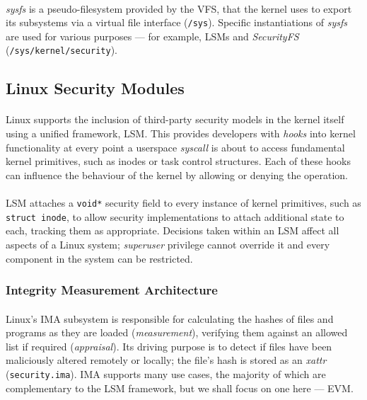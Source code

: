 \paragraph{} \textit{sysfs} is a pseudo-filesystem provided by the VFS, that the kernel uses to export its subsystems via a virtual file interface (\texttt{/sys}). Specific instantiations of \textit{sysfs} are used for various purposes --- for example, LSMs and \textit{SecurityFS} (\texttt{/sys/kernel/security}).



\subsection{Linux Security Modules}
\label{sec:lsm}

\paragraph{} Linux supports the inclusion of third-party security models in the kernel itself using a unified framework, LSM. This provides developers with \textit{hooks} into kernel functionality at every point a userspace \textit{syscall} is about to access fundamental kernel primitives, such as inodes or task control structures. Each of these hooks can influence the behaviour of the kernel by allowing or denying the operation.

\paragraph{} LSM attaches a \texttt{void*} security field to every instance of kernel primitives, such as \texttt{struct inode}, to allow security implementations to attach additional state to each, tracking them as appropriate. Decisions taken within an LSM affect all aspects of a Linux system; \textit{superuser} privilege cannot override it and every component in the system can be restricted.


\subsubsection{Integrity Measurement Architecture}
\label{sec:ima}

\paragraph{} Linux's IMA subsystem is responsible for calculating the hashes of files and programs as they are loaded (\textit{measurement}), verifying them against an allowed list if required (\textit{appraisal}). Its driving purpose is to detect if files have been maliciously altered remotely or locally; the file's hash is stored as an \textit{xattr} (\texttt{security.ima}). IMA supports many use cases, the majority of which are complementary to the LSM framework, but we shall focus on one here --- EVM.

